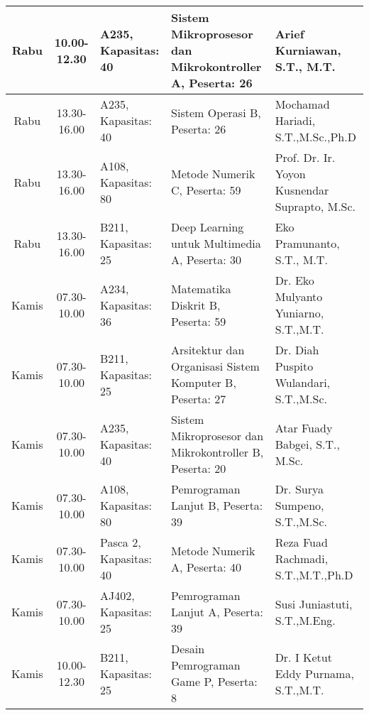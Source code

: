 \begin{longtable}[c]{|c|c|>{\centering\arraybackslash}m{2.5cm}|>{\centering\arraybackslash}m{4cm}|>{\centering\arraybackslash}m{3.2cm}|}
    Rabu   & 10.00-12.30 & A235, Kapasitas: 40    & Sistem Mikroprosesor dan Mikrokontroller A, \linebreak Peserta: 26  & Arief Kurniawan, S.T., M.T.                   \\ \hline
    Rabu   & 13.30-16.00 & A235, Kapasitas: 40    & Sistem Operasi B, \linebreak Peserta: 26                            & Mochamad Hariadi, S.T.,M.Sc.,Ph.D             \\ \hline
    Rabu   & 13.30-16.00 & A108, Kapasitas: 80    & Metode Numerik C, \linebreak Peserta: 59                            & Prof. Dr. Ir. Yoyon Kusnendar Suprapto, M.Sc. \\ \hline
    Rabu   & 13.30-16.00 & B211, Kapasitas: 25    & Deep Learning untuk Multimedia A, \linebreak Peserta: 30            & Eko Pramunanto, S.T., M.T.                    \\ \hline
    Kamis  & 07.30-10.00 & A234, Kapasitas: 36    & Matematika Diskrit B, \linebreak Peserta: 59                        & Dr. Eko Mulyanto Yuniarno, S.T.,M.T.          \\ \hline
    Kamis  & 07.30-10.00 & B211, Kapasitas: 25    & Arsitektur dan Organisasi Sistem Komputer B, \linebreak Peserta: 27 & Dr. Diah Puspito Wulandari, S.T.,M.Sc.        \\ \hline
    Kamis  & 07.30-10.00 & A235, Kapasitas: 40    & Sistem Mikroprosesor dan Mikrokontroller B, \linebreak Peserta: 20  & Atar Fuady Babgei, S.T., M.Sc.                \\ \hline
    Kamis  & 07.30-10.00 & A108, Kapasitas: 80    & Pemrograman Lanjut B, \linebreak Peserta: 39                        & Dr. Surya Sumpeno, S.T.,M.Sc.                 \\ \hline
    Kamis  & 07.30-10.00 & Pasca 2, Kapasitas: 40 & Metode Numerik A, \linebreak Peserta: 40                            & Reza Fuad Rachmadi, S.T.,M.T.,Ph.D            \\ \hline
    Kamis  & 07.30-10.00 & AJ402, Kapasitas: 25   & Pemrograman Lanjut A, \linebreak Peserta: 39                        & Susi Juniastuti, S.T.,M.Eng.                  \\ \hline
    Kamis  & 10.00-12.30 & B211, Kapasitas: 25    & Desain Pemrograman Game P, \linebreak Peserta: 8                    & Dr. I Ketut Eddy Purnama, S.T.,M.T.           \\ \hline

\end{longtable}
